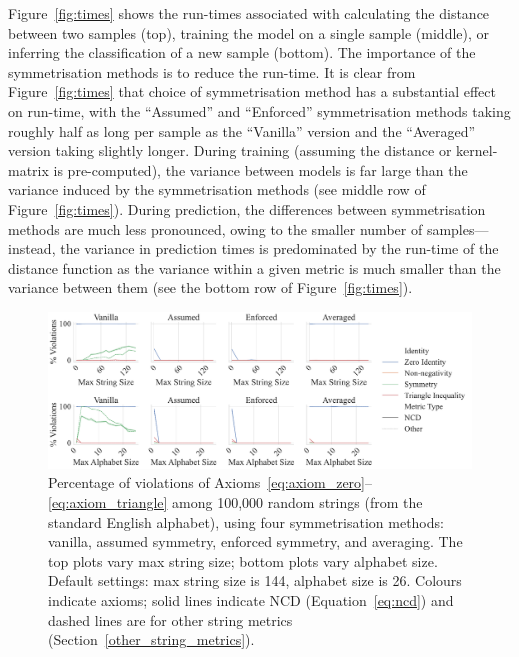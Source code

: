 \documentclass[preprint,12pt]{article}
\begin{document}
Figure~\ref{fig:times} shows the run-times associated with calculating the distance between two samples (top), training the model on a single sample (middle), or inferring the classification of a new sample (bottom). 
The importance of the symmetrisation methods is to reduce the run-time. 
It is clear from Figure~\ref{fig:times} that choice of symmetrisation method has a substantial effect on run-time, with the ``Assumed'' and ``Enforced'' symmetrisation methods taking roughly half as long per sample as the ``Vanilla'' version and the ``Averaged'' version taking slightly longer. 
During training (assuming the distance or kernel-matrix is pre-computed), the variance between models is far large than the variance induced by the symmetrisation methods (see middle row of Figure~\ref{fig:times}). 
During prediction, the differences between symmetrisation methods are much less pronounced, owing to the smaller number of samples---instead, the variance in prediction times is predominated by the run-time of the distance function as the variance within a given metric is much smaller than the variance between them (see the bottom row of Figure~\ref{fig:times}).

\begin{figure}[ht!]
    \centering
    \includegraphics[width=\textwidth]{images/synthetic_check.pdf}
    \caption{
   Percentage of violations of Axioms~\ref{eq:axiom_zero}--\ref{eq:axiom_triangle} among 100,000 random strings (from the standard English alphabet), using four symmetrisation methods: vanilla, assumed symmetry, enforced symmetry, and averaging. The top plots vary max string size; bottom plots vary alphabet size. Default settings: max string size is 144, alphabet size is 26. Colours indicate axioms; solid lines indicate NCD (Equation~\ref{eq:ncd}) and dashed lines are for other string metrics (Section~\ref{other_string_metrics}).
    }
    \label{fig:synthetic_check}
\end{figure}
\end{document}
